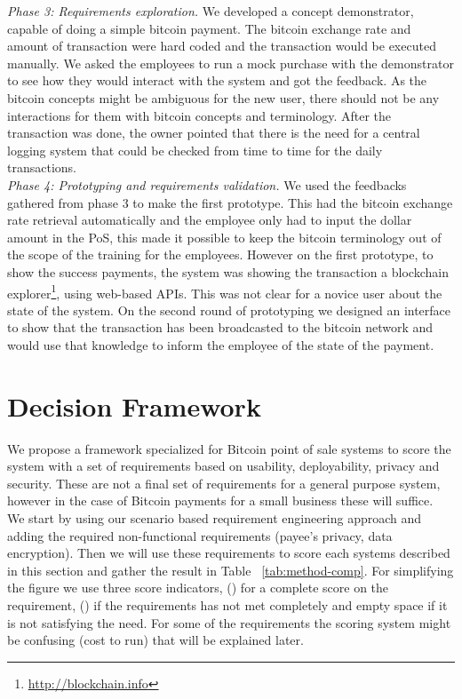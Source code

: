 \textit{Phase 3: Requirements exploration.}
We developed a concept demonstrator, capable of doing a simple bitcoin payment. The bitcoin exchange rate and amount of transaction were hard coded and the transaction would be executed manually. We asked the employees to run a mock purchase with the demonstrator to see how they would interact with the system and got the feedback. As the bitcoin concepts might be ambiguous for the new user, there should not be any interactions for them with bitcoin concepts and terminology. After the transaction was done, the owner pointed that there is the need for a central logging system that could be checked from time to time for the daily transactions.\\


\textit{Phase 4: Prototyping and requirements validation.}
We used the feedbacks gathered from phase 3 to make the first prototype. This had the bitcoin exchange rate retrieval automatically and the employee only had to input the dollar amount in the PoS, this made it possible to keep the bitcoin terminology out of the scope of the training for the employees. However on the first prototype, to show the success payments, the system was showing the transaction a blockchain explorer\footnote{\url{http://blockchain.info}}, using web-based APIs. This was not clear for a novice user about the state of the system. On the second round of prototyping we designed an interface to show that the transaction has been broadcasted to the bitcoin network and would use that knowledge to inform the employee of the state of the payment.\\

\section{Decision Framework}
We propose a framework specialized for Bitcoin point of sale systems to score the system with a set of requirements based on usability, deployability, privacy and security. These are not a final set of requirements for a general purpose system, however in the case of Bitcoin payments for a small business these will suffice.\\
We start by using our scenario based requirement engineering approach and adding the required non-functional requirements (\eg payee's privacy, data encryption). Then we will use these requirements to score each systems described in this section and gather the result in Table ~\ref{tab:method-comp}. For simplifying the figure we use three score indicators,  (\full) for a complete score on the requirement, (\prt) if the requirements has not met completely and empty space if it is not satisfying the need. For some of the requirements the scoring system might be confusing (\eg cost to run) that will be explained later.

